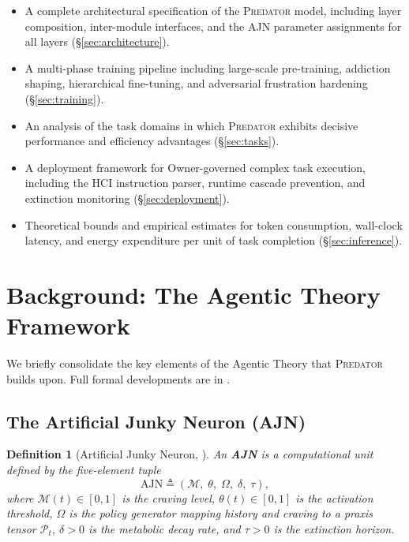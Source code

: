 \documentclass[12pt,a4paper]{article}
\newtheorem{definition}{Definition}[section]
\newcommand{\PREDATOR}{\textsc{Predator}}
\begin{document}
\begin{itemize}
  \item A complete architectural specification of the \PREDATOR{} model,
    including layer composition, inter-module interfaces, and the AJN
    parameter assignments for all layers (\S\ref{sec:architecture}).
  \item A multi-phase training pipeline including large-scale pre-training,
    addiction shaping, hierarchical fine-tuning, and adversarial frustration
    hardening (\S\ref{sec:training}).
  \item An analysis of the task domains in which \PREDATOR{} exhibits
    decisive performance and efficiency advantages (\S\ref{sec:tasks}).
  \item A deployment framework for Owner-governed complex task execution,
    including the HCI instruction parser, runtime cascade prevention, and
    extinction monitoring (\S\ref{sec:deployment}).
  \item Theoretical bounds and empirical estimates for token consumption,
    wall-clock latency, and energy expenditure per unit of task completion
    (\S\ref{sec:inference}).
\end{itemize}

\section{Background: The Agentic Theory Framework}
\label{sec:background}

We briefly consolidate the key elements of the Agentic Theory that
\PREDATOR{} builds upon. Full formal developments are in
\cite{tapiador2024ajn, tapiador2024annpsi, tapiador2024daf}.

\subsection{The Artificial Junky Neuron (AJN)}

\begin{definition}[Artificial Junky Neuron, \cite{tapiador2024ajn}]
An \textbf{AJN} is a computational unit defined by the five-element tuple
\[
  \text{AJN} \triangleq \left(\mathcal{M},\;\theta,\;\Omega,\;\delta,\;\tau\right),
\]
where $\mathcal{M}(t)\in[0,1]$ is the \emph{craving level},
$\theta(t)\in[0,1]$ is the \emph{activation threshold},
$\Omega$ is the \emph{policy generator} mapping history and craving to a
praxis tensor $\mathcal{P}_t$,
$\delta>0$ is the \emph{metabolic decay rate}, and
$\tau>0$ is the \emph{extinction horizon}.
\end{definition}
\end{document}
